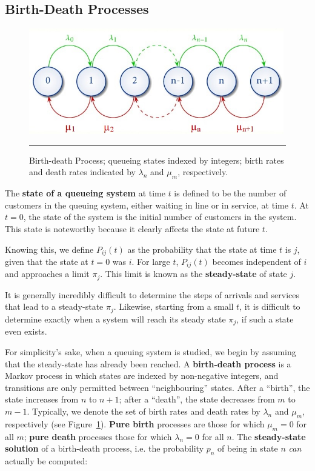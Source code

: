 \subsection{Birth-Death Processes}
\begin{figure}[!t]
	\centering
		\includegraphics[width=0.99\textwidth]{Images/fig2Queue.jpg}
	\caption[\small Birth-death process]{\small Birth-death Process; queueing states indexed by integers; birth rates and death rates indicated by $\lambda_n$ and $\mu_m$, respectively.}
	\label{fig:2}\hrule
\end{figure}
\afterpage{\FloatBarrier}
\noindent The \textbf{state of a queueing system} at time $t$ is defined to be the number of customers in the queuing system, either waiting in line or in service, at time $t$. At $t = 0$, the state of the system is  the initial number of customers in the system. This state is noteworthy because it clearly affects the state at future $t$. \par Knowing this, we define $P_{ij} (t)$ as the probability that the state at time $t$ is $j$, given that the state at $t = 0$ was $i$. For large $t$, $P_{ij} (t)$ becomes independent of $i$ and approaches a limit $\pi_{j}$. This limit is known as the \textbf{steady-state} of state $j$.\par It is generally incredibly difficult to determine the steps of arrivals and services that lead to a steady-state $\pi_j$. Likewise, starting from a small $t$, it is difficult to determine exactly when a system will reach
its steady state $\pi_j$, if such a state even exists. \par For simplicity's sake, when a queuing system is studied, we begin by assuming that the steady-state has already been reached.\newl  
A \textbf{birth-death process} is a Markov process in which states are indexed by non-negative integers, and transitions are only permitted between ``neighbouring'' states. After a ``birth'', the state increases from $n$ to $n+1$; after a ``death'', the state decreases from $m$ to $m-1$. Typically, we denote the set of birth rates and death rates by $\lambda_n$ and $\mu_m$, respectively (see Figure~\ref{fig:2}). \textbf{Pure birth} processes are those for which $\mu_m=0$ for all $m$; \textbf{pure death} processes those for which $\lambda_n=0$ for all $n$. The  \textbf{steady-state solution} of a birth-death process, i.e. the probability $p_n$ of being in state $n$ \textit{can} actually be computed: 
